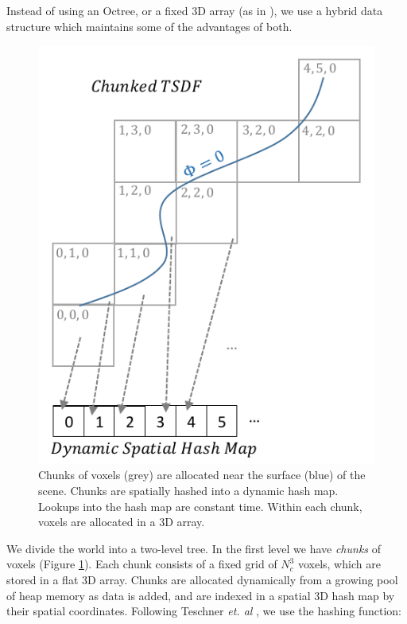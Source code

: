 \documentclass[conference,10pt]{IEEEtran}
\begin{document}
Instead of using an Octree, or a fixed 3D array (as in \cite{Newcombe,
Whelan2013}), we use a hybrid data structure which maintains some of the
advantages of both. 

\begin{figure}
  \centering
    \includegraphics[width=0.95\columnwidth]{img/chunks.pdf}
      \caption{Chunks of voxels (grey) are allocated near the surface (blue) of
      the scene. Chunks are spatially hashed \cite{SpatialHashing} into a
      dynamic hash map. Lookups into the hash map are constant time. Within each
      chunk, voxels are allocated in a 3D array.}
  \label{fig:chunks} 
\end{figure} 

We divide the world into a two-level tree. In the first level we have
\emph{chunks} of voxels (Figure \ref{fig:chunks}). Each chunk consists of a
fixed grid of $N_c^3$ voxels, which are stored in a flat 3D array. Chunks are
allocated dynamically from a growing pool of heap memory as data is added, and
are indexed in a spatial 3D hash map \cite{SpatialHashing} by their spatial
coordinates. Following Teschner \emph{et. al} \cite{SpatialHashing}, we use the
hashing function:
\end{document}

